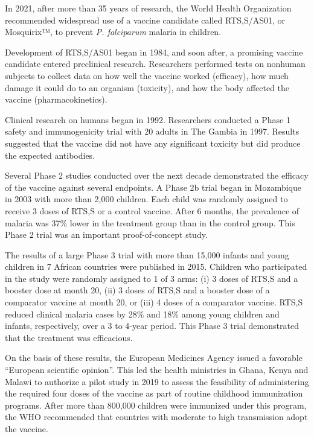 \documentclass[
  letterpaper,
  DIV=11,
  numbers=noendperiod,
  oneside]{scrreprt}
\begin{document}
\begin{tcolorbox}[standard jigsaw,colback=white, titlerule=0mm, colbacktitle=quarto-callout-note-color!10!white, bottomtitle=1mm, rightrule=.15mm, colframe=quarto-callout-note-color-frame, toprule=.15mm, opacitybacktitle=0.6, leftrule=.75mm, title={\textbf{CASE STUDY: Developing the first malaria vaccine}}, arc=.35mm, bottomrule=.15mm, toptitle=1mm, coltitle=black, opacityback=0, left=2mm]
In 2021, after more than 35 years of research, the World Health
Organization recommended widespread use of a vaccine candidate called
RTS,S/AS01, or Mosquirix™, to prevent \emph{P. falciparum} malaria in
children.

Development of RTS,S/AS01 began in 1984, and soon after, a promising
vaccine candidate entered preclinical research. Researchers performed
tests on nonhuman subjects to collect data on how well the vaccine
worked (efficacy), how much damage it could do to an organism
(toxicity), and how the body affected the vaccine (pharmacokinetics).

Clinical research on humans began in 1992. Researchers conducted a Phase
1 safety and immunogenicity trial with 20 adults in The Gambia in 1997.
Results suggested that the vaccine did not have any significant toxicity
but did produce the expected antibodies.

Several Phase 2 studies conducted over the next decade demonstrated the
efficacy of the vaccine against several endpoints. A Phase 2b trial
began in Mozambique in 2003 with more than 2,000 children. Each child
was randomly assigned to receive 3 doses of RTS,S or a control vaccine.
After 6 months, the prevalence of malaria was 37\% lower in the
treatment group than in the control group. This Phase 2 trial was an
important proof-of-concept study.

The results of a large Phase 3 trial with more than 15,000 infants and
young children in 7 African countries were published in 2015. Children
who participated in the study were randomly assigned to 1 of 3 arms: (i)
3 doses of RTS,S and a booster dose at month 20, (ii) 3 doses of RTS,S
and a booster dose of a comparator vaccine at month 20, or (iii) 4 doses
of a comparator vaccine. RTS,S reduced clinical malaria cases by 28\%
and 18\% among young children and infants, respectively, over a 3 to
4-year period. This Phase 3 trial demonstrated that the treatment was
efficacious.

On the basis of these results, the European Medicines Agency issued a
favorable ``European scientific opinion''. This led the health
ministries in Ghana, Kenya and Malawi to authorize a pilot study in 2019
to assess the feasibility of administering the required four doses of
the vaccine as part of routine childhood immunization programs. After
more than 800,000 children were immunized under this program, the WHO
recommended that countries with moderate to high transmission adopt the
vaccine.
\end{tcolorbox}
\end{document}
